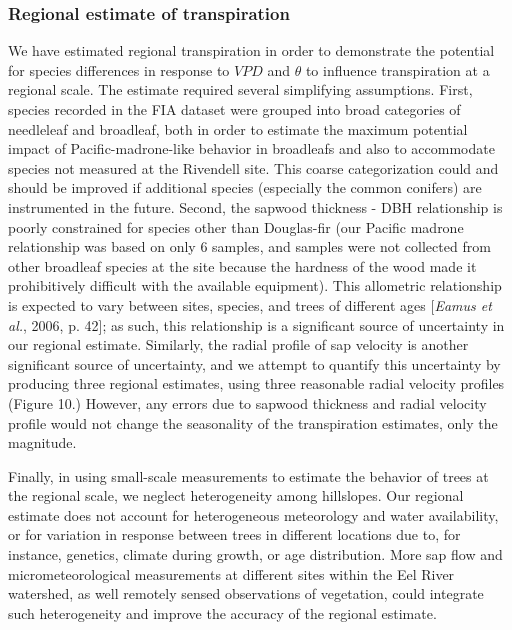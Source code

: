 \subsubsection{Regional estimate of transpiration}
We have estimated regional transpiration in order to demonstrate the potential for species differences in response to $VPD$ and $\theta$ to influence transpiration at a regional scale.  The estimate required several simplifying assumptions.  First, species recorded in the FIA dataset were grouped into broad categories of needleleaf and broadleaf, both in order to estimate the maximum potential impact of Pacific-madrone-like behavior in broadleafs and also to accommodate species not measured at the Rivendell site.  This coarse categorization could and should be improved if additional species (especially the common conifers) are instrumented in the future.  Second, the sapwood thickness - DBH relationship is poorly constrained for species other than Douglas-fir (our Pacific madrone relationship was based on only 6 samples, and samples were not collected from other broadleaf species at the site because the hardness of the wood made it prohibitively difficult with the available equipment).  This allometric relationship is expected to vary between sites, species, and trees of different ages [\textit{Eamus et al.}, 2006, p. 42]; as such, this relationship is a significant source of uncertainty in our regional estimate.  Similarly, the radial profile of sap velocity is another significant source of uncertainty, and we attempt to quantify this uncertainty by producing three regional estimates, using three reasonable radial velocity profiles (Figure 10.)  However, any errors due to sapwood thickness and radial velocity profile would not change the seasonality of the transpiration estimates, only the magnitude.

Finally, in using small-scale measurements to estimate the behavior of trees at the regional scale, we neglect heterogeneity among hillslopes.  Our regional estimate does not account for heterogeneous meteorology and water availability, or for variation in response between trees in different locations due to, for instance, genetics, climate during growth, or age distribution.  More sap flow and micrometeorological measurements at different sites within the Eel River watershed, as well remotely sensed observations of vegetation, could integrate such heterogeneity and improve the accuracy of the regional estimate.

